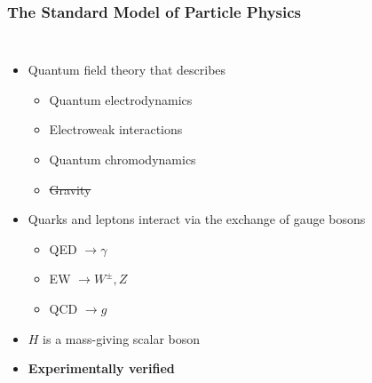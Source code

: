 \begin{frame}
  \frametitle{\textbf{The Standard Model of Particle Physics}}
  \begin{columns}
    \begin{itemize}
    \item Quantum field theory that describes
      \begin{itemize}
      \item Quantum electrodynamics
      \item Electroweak interactions
      \item Quantum chromodynamics
      \item \st{Gravity}
      \end{itemize}
    \item Quarks and leptons interact via the exchange of gauge bosons
      \begin{itemize}
      \item QED $\to \gamma$
      \item EW $\to W^{\pm}, Z$
      \item QCD $\to g$
      \end{itemize}
    \item $H$ is a mass-giving scalar boson
    \item \textbf{Experimentally verified}
    \end{itemize}
  \end{columns}
\end{frame}
